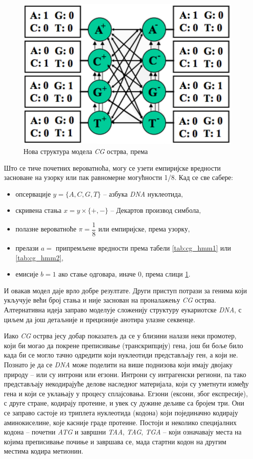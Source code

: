 \documentclass[12pt,oneside]{memoir}
\begin{document}
\begin{CJK}{UTF8}{ipxm}
\begin{figure}[!ht]
  \centering
  \includegraphics[width=.7\textwidth]{cg_stanja.png}
  \caption{Нова структура модела \textit{CG} острва, према \cite{kellis2021}}
  \label{fig:cg_stanja}
\end{figure}

Што се тиче почетних вероватноћа, могу се узети емпиријске вредности засноване на узорку или пак равномерне могућности 1/8. Кад се све сабере:
\begin{itemize}
  \item опсервације $y = \{A, C, G, T\}$ -- азбука \textit{DNA} нуклеотида,
  \item скривена стања $x = y \times \{+, -\}$ -- Декартов производ симбола,
  \item полазне вероватноће $\pi = \dfrac{1}{8}$ или емпиријске, према узорку,
  \item прелази $a =$ припремљене вредности према табели \ref{tab:cg_hmm1} или \ref{tab:cg_hmm2},
  \item емисије $b = 1$ ако стање одговара, иначе $0$, према слици \ref{fig:cg_stanja}.
\end{itemize}

И овакав модел даје врло добре резултате. Други приступ потрази за генима који укључује већи број стања и није заснован на проналажењу \textit{CG} острва. Алтернативна идеја заправо моделује сложенију структуру еукариотске \textit{DNA}, с циљем да још детаљније и прецизније анотира улазне секвенце.

Иако \textit{CG} острва јесу добар показатељ да се у близини налази неки промотер, који би могао да покрене преписивање (транскрипцију) гена, још би боље било када би се могло тачно одредити који нуклеотиди представљају ген, а који не. Познато је да се \textit{DNA} може поделити на више поднизова који имају двојаку природу -- или су интрони или егзони\cite{knapp2007, yoon2009}. Интрони су интрагенски региони, па тако представљају некодирајуће делове наследног материјала, који су уметнути између гена и који се уклањају у процесу сплајсовања. Егзони (ексони, због експресије), с друге стране, кодирају протеине, и увек су дужине дељиве са бројем три. Они се заправо састоје из триплета нуклеотида (кодона) који појединачно кодирају аминокиселине, које касније граде протеине. Постоји и неколико специјалних кодона -- почетни \textit{ATG} и завршни \textit{TAA}, \textit{TAG}, \textit{TGA} -- који означавају места на којима преписивање почиње и завршава се, мада стартни кодон на другим местима кодира метионин.


\end{CJK}
\end{document}

